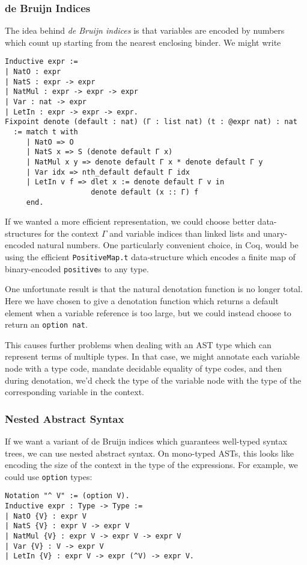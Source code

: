 \subsubsection{de Bruijn Indices} \label{sec:binders:de-bruijn}
The idea behind \emph{de Bruijn indices} is that variables are encoded by numbers which count up starting from the nearest enclosing binder.
We might write
\begin{verbatim}
Inductive expr :=
| NatO : expr
| NatS : expr -> expr
| NatMul : expr -> expr -> expr
| Var : nat -> expr
| LetIn : expr -> expr -> expr.
Fixpoint denote (default : nat) (Γ : list nat) (t : @expr nat) : nat
  := match t with
     | NatO => O
     | NatS x => S (denote default Γ x)
     | NatMul x y => denote default Γ x * denote default Γ y
     | Var idx => nth_default default Γ idx
     | LetIn v f => dlet x := denote default Γ v in
                    denote default (x :: Γ) f
     end.
\end{verbatim}
If we wanted a more efficient representation, we could choose better data-structures for the context $\Gamma$ and variable indices than linked lists and unary-encoded natural numbers.
One particularly convenient choice, in Coq, would be using the efficient \texttt{PositiveMap.t} data-structure which encodes a finite map of binary-encoded \texttt{positive}s to any type.

One unfortunate result is that the natural denotation function is no longer total.
Here we have chosen to give a denotation function which returns a default element when a variable reference is too large, but we could instead choose to return an \texttt{option nat}.

This causes further problems when dealing with an AST type which can represent terms of multiple types.
In that case, we might annotate each variable node with a type code, mandate decidable equality of type codes, and then during denotation, we'd check the type of the variable node with the type of the corresponding variable in the context.

\subsubsection{Nested Abstract Syntax} \label{sec:binders:nested-abstract-syntax}
If we want a variant of de Bruijn indices which guarantees well-typed syntax trees, we can use nested abstract syntax.
On mono-typed ASTs, this looks like encoding the size of the context in the type of the expressions.
For example, we could use \texttt{option} types:~\cite{Nested2012Hirschowitz}
\begin{verbatim}
Notation "^ V" := (option V).
Inductive expr : Type -> Type :=
| NatO {V} : expr V
| NatS {V} : expr V -> expr V
| NatMul {V} : expr V -> expr V -> expr V
| Var {V} : V -> expr V
| LetIn {V} : expr V -> expr (^V) -> expr V.
\end{verbatim}

